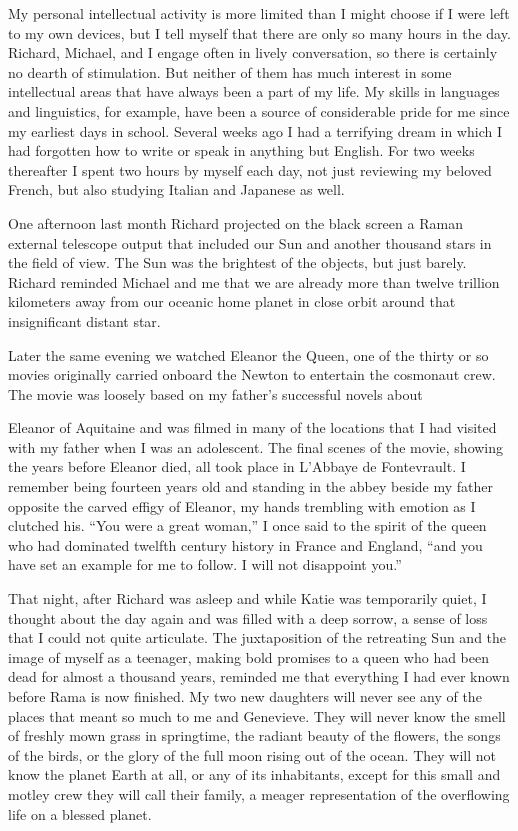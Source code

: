 \documentclass[]{article}
\begin{document}
My personal intellectual activity is more limited than I might choose if I were left to my own devices, but I tell myself that there are only so many hours in the day. Richard, Michael, and I engage often in lively conversation, so there is certainly no dearth of stimulation. But neither of them has much interest in some intellectual areas that have always been a part of my life. My skills in languages and linguistics, for example, have been a source of considerable pride for me since my earliest days in school. Several weeks ago I had a terrifying dream in which I had forgotten how to write or speak in anything but English. For two weeks thereafter I spent two hours by myself each day, not just reviewing my beloved French, but also studying Italian and Japanese as well.

One afternoon last month Richard projected on the black screen a Raman external telescope output that included our Sun and another thousand stars in the field of view. The Sun was the brightest of the objects, but just barely. Richard reminded Michael and me that we are already more than twelve trillion kilometers away from our oceanic home planet in close orbit around that insignificant distant star.

Later the same evening we watched Eleanor the Queen, one of the thirty or so movies originally carried onboard the Newton to entertain the cosmonaut crew.  The movie was loosely based on my father’s successful novels about

Eleanor of Aquitaine and was filmed in many of the locations that I had visited with my father when I was an adolescent. The final scenes of the movie, showing the years before Eleanor died, all took place in L’Abbaye de Fontevrault. I remember being fourteen years old and standing in the abbey beside my father opposite the carved effigy of Eleanor, my hands trembling with emotion as I clutched his. “You were a great woman,” I once said to the spirit of the queen who had dominated twelfth century history in France and England, “and you have set an example for me to follow. I will not disappoint you.”

That night, after Richard was asleep and while Katie was temporarily quiet, I thought about the day again and was filled with a deep sorrow, a sense of loss that I could not quite articulate. The juxtaposition of the retreating Sun and the image of myself as a teenager, making bold promises to a queen who had been dead for almost a thousand years, reminded me that everything I had ever known before Rama is now finished. My two new daughters will never see any of the places that meant so much to me and Genevieve. They will never know the smell of freshly mown grass in springtime, the radiant beauty of the flowers, the songs of the birds, or the glory of the full moon rising out of the ocean. They will not know the planet Earth at all, or any of its inhabitants, except for this small and motley crew they will call their family, a meager representation of the overflowing life on a blessed planet.
\end{document}
